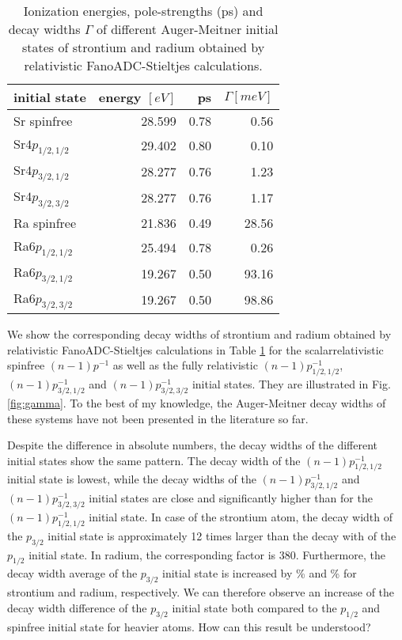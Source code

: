 \documentclass[aps,amssymb,preprint,a4paper,longbibliography]{revtex4}
\begin{document}
%
\begin{table}[htb]
 \centering
 \caption{Ionization energies, pole-strengths (ps) and decay widths $\Gamma$ of
          different Auger-Meitner initial states of strontium and radium obtained
          by relativistic FanoADC-Stieltjes calculations.}
 \begin{tabular}{lrrr}
  \toprule
   initial state    & energy $[\unit{eV}]$ & ps & $\Gamma [\unit{meV}]$\\
  \midrule
   Sr spinfree      & 28.599 & 0.78 &   0.56\\  
   Sr$4p_{1/2,1/2}$ & 29.402 & 0.80 &   0.10\\
   Sr$4p_{3/2,1/2}$ & 28.277 & 0.76 &   1.23\\
   Sr$4p_{3/2,3/2}$ & 28.277 & 0.76 &   1.17\\
  \midrule
   Ra spinfree      & 21.836 & 0.49 &  28.56 \\  
   Ra$6p_{1/2,1/2}$ & 25.494 & 0.78 &   0.26\\
   Ra$6p_{3/2,1/2}$ & 19.267 & 0.50 &  93.16 \\
   Ra$6p_{3/2,3/2}$ & 19.267 & 0.50 &  98.86\\
  \bottomrule
 \end{tabular}
 \label{tab:widths}
\end{table}

We show the corresponding decay
widths of strontium and radium obtained by relativistic FanoADC-Stieltjes
calculations in Table \ref{tab:widths}
for the scalarrelativistic spinfree $(n-1)p^{-1}$ as well as the
fully relativistic $(n-1)p_{1/2,1/2}^{-1}$, $(n-1)p_{3/2,1/2}^{-1}$ and
$(n-1)p_{3/2,3/2}^{-1}$ initial states. They are illustrated in Fig. \ref{fig:gamma}.
To the best of my knowledge, the Auger-Meitner decay widths of these systems have
not been presented in the literature so far.

Despite the difference in absolute numbers, the decay widths
of the different initial states show the same pattern. The decay width of
the $(n-1)p_{1/2,1/2}^{-1}$ initial state is lowest, while the decay widths
of the $(n-1)p_{3/2,1/2}^{-1}$ and
$(n-1)p_{3/2,3/2}^{-1}$ initial states are close and significantly higher than
for the $(n-1)p_{1/2,1/2}^{-1}$ initial state.
In case of the strontium atom, the decay width of the $p_{3/2}$ initial state
is approximately 12 times larger than the decay with of the $p_{1/2}$ initial state.
In radium, the corresponding factor is 380.
Furthermore, the decay width average of the $p_{3/2}$ initial state is increased 
by \unit[114]{\%} and \unit[236]{\%} for strontium and radium, respectively.
We can therefore observe an increase
of the decay width difference of the $p_{3/2}$ initial state both
compared to the $p_{1/2}$ and spinfree initial state for heavier atoms.
How can this result be understood?
\end{document}
